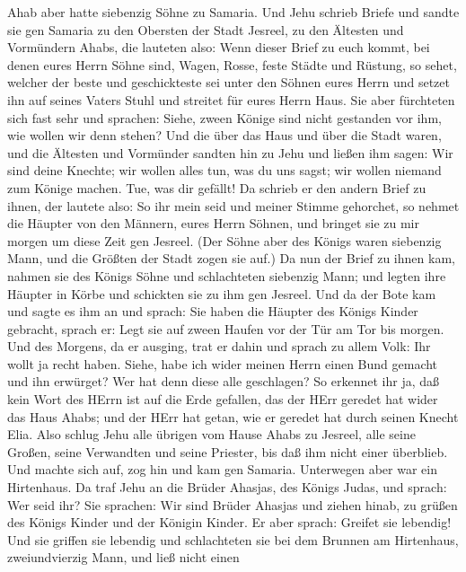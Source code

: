  Ahab aber hatte siebenzig Söhne zu Samaria. Und Jehu
schrieb Briefe und sandte sie gen Samaria zu den Obersten der Stadt
Jesreel, zu den Ältesten und Vormündern Ahabs, die lauteten also:
 Wenn dieser Brief zu euch kommt, bei denen eures Herrn
Söhne sind, Wagen, Rosse, feste Städte und Rüstung,  so
sehet, welcher der beste und geschickteste sei unter den Söhnen eures
Herrn und setzet ihn auf seines Vaters Stuhl und streitet für eures
Herrn Haus.  Sie aber fürchteten sich fast sehr und
sprachen: Siehe, zween Könige sind nicht gestanden vor ihm, wie wollen
wir denn stehen?  Und die über das Haus und über die Stadt
waren, und die Ältesten und Vormünder sandten hin zu Jehu und ließen ihm
sagen: Wir sind deine Knechte; wir wollen alles tun, was du uns sagst;
wir wollen niemand zum Könige machen. Tue, was dir gefällt! 
Da schrieb er den andern Brief zu ihnen, der lautete also: So ihr mein
seid und meiner Stimme gehorchet, so nehmet die Häupter von den Männern,
eures Herrn Söhnen, und bringet sie zu mir morgen um diese Zeit gen
Jesreel. (Der Söhne aber des Königs waren siebenzig Mann, und die
Größten der Stadt zogen sie auf.)  Da nun der Brief zu ihnen
kam, nahmen sie des Königs Söhne und schlachteten siebenzig Mann; und
legten ihre Häupter in Körbe und schickten sie zu ihm gen Jesreel.
 Und da der Bote kam und sagte es ihm an und sprach: Sie
haben die Häupter des Königs Kinder gebracht, sprach er: Legt sie auf
zween Haufen vor der Tür am Tor bis morgen.  Und des
Morgens, da er ausging, trat er dahin und sprach zu allem Volk: Ihr
wollt ja recht haben. Siehe, habe ich wider meinen Herrn einen Bund
gemacht und ihn erwürget? Wer hat denn diese alle geschlagen?
 So erkennet ihr ja, daß kein Wort des HErrn ist auf die
Erde gefallen, das der HErr geredet hat wider das Haus Ahabs; und der
HErr hat getan, wie er geredet hat durch seinen Knecht Elia.
 Also schlug Jehu alle übrigen vom Hause Ahabs zu Jesreel,
alle seine Großen, seine Verwandten und seine Priester, bis daß ihm
nicht einer überblieb.  Und machte sich auf, zog hin und
kam gen Samaria. Unterwegen aber war ein Hirtenhaus.  Da
traf Jehu an die Brüder Ahasjas, des Königs Judas, und sprach: Wer seid
ihr? Sie sprachen: Wir sind Brüder Ahasjas und ziehen hinab, zu grüßen
des Königs Kinder und der Königin Kinder.  Er aber sprach:
Greifet sie lebendig! Und sie griffen sie lebendig und schlachteten sie
bei dem Brunnen am Hirtenhaus, zweiundvierzig Mann, und ließ nicht einen
